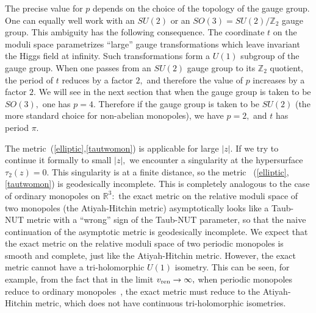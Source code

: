 \documentclass[a4paper,12pt, amsfonts, amssymb]{article}
\newcommand{\RR}{{\mathbb R}}
\newcommand{\ZZ}{{\mathbb Z}}
\newcommand{\ra}{\rightarrow}
\newcommand{\vr}{v_{{\rm ren}}}
\begin{document}
The precise value for $p$ depends on the choice of the topology of the
gauge group. One can equally well work with an $SU(2)$ or an $SO(3)=SU(2)/\ZZ_2$ gauge group. This ambiguity has the following consequence. The coordinate $t$ on the moduli space parametrizes ``large'' gauge transformations which leave invariant the Higgs field at infinity. Such transformations form
a $U(1)$ subgroup of the gauge group. When one passes from an $SU(2)$
gauge group to its $\ZZ_2$ quotient, the period of $t$ reduces by a factor
$2,$ and therefore the value of $p$ increases by a factor $2.$ We will
see in the next section that when the gauge group is taken to be $SO(3),$
one has $p=4.$ Therefore if the gauge group is taken to be $SU(2)$ (the
more standard choice for non-abelian monopoles), we have $p=2,$ and
$t$ has period $\pi.$

The metric~(\ref{elliptic},\ref{tautwomon}) is applicable for large
$|z|.$ If we try to continue it formally to small $|z|,$ we encounter
a singularity at the hypersurface $\tau_2(z)=0.$ This singularity is
at a finite distance, so the metric ~(\ref{elliptic},\ref{tautwomon})
is geodesically incomplete. This is completely analogous to the
case of ordinary monopoles on $\RR^3:$ the exact metric on the relative
moduli space of two monopoles (the Atiyah-Hitchin metric) asymptotically
looks like a Taub-NUT metric with a ``wrong'' sign of the Taub-NUT parameter,
so that the naive continuation of the asymptotic metric is geodesically
incomplete. We expect that the exact metric on the relative
moduli space of two periodic monopoles is smooth and complete, just like
the Atiyah-Hitchin metric. However, the exact metric cannot have a
tri-holomorphic $U(1)$ isometry. This can be seen, for example, from the
fact that in the limit $\vr\ra\infty,$ when periodic monopoles
reduce to ordinary monopoles~\cite{ustwo}, the exact metric must reduce
to the Atiyah-Hitchin metric, which does not have continuous
tri-holomorphic isometries.
\end{document}
